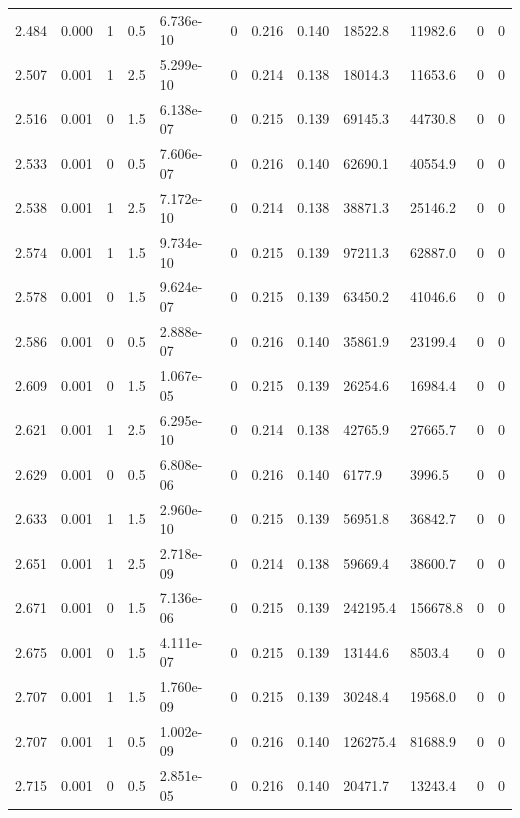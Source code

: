 \documentclass[preview]{standalone}
\begin{document}
{{{{\begin{tabular}{L{1.2cm}C{1.2cm} C{0.3cm}C{0.5cm} C{1.4cm}C{1.4cm} C{1.4cm}C{1.4cm} C{1.6cm}C{1.6cm} C{1.6cm}C{1.6cm}}
  2.484  &  0.000  & 1     & 0.5 &  6.736e-10  & 0  &  0.216&   0.140& 18522.8 & 11982.6   &  0 & 0  \\ 
  2.507  &  0.001  & 1     & 2.5 &  5.299e-10  & 0  &  0.214&   0.138& 18014.3 & 11653.6   &  0 & 0  \\ 
  2.516  &  0.001  & 0     & 1.5 &  6.138e-07  & 0  &  0.215&   0.139& 69145.3 & 44730.8   &  0 & 0  \\ 
  2.533  &  0.001  & 0     & 0.5 &  7.606e-07  & 0  &  0.216&   0.140& 62690.1 & 40554.9   &  0 & 0  \\ 
  2.538  &  0.001  & 1     & 2.5 &  7.172e-10  & 0  &  0.214&   0.138& 38871.3 & 25146.2   &  0 & 0  \\ 
  2.574  &  0.001  & 1     & 1.5 &  9.734e-10  & 0  &  0.215&   0.139& 97211.3 & 62887.0   &  0 & 0  \\ 
  2.578  &  0.001  & 0     & 1.5 &  9.624e-07  & 0  &  0.215&   0.139& 63450.2 & 41046.6   &  0 & 0  \\ 
  2.586  &  0.001  & 0     & 0.5 &  2.888e-07  & 0  &  0.216&   0.140& 35861.9 & 23199.4   &  0 & 0  \\ 
  2.609  &  0.001  & 0     & 1.5 &  1.067e-05  & 0  &  0.215&   0.139& 26254.6 & 16984.4   &  0 & 0  \\ 
  2.621  &  0.001  & 1     & 2.5 &  6.295e-10  & 0  &  0.214&   0.138& 42765.9 & 27665.7   &  0 & 0  \\ 
  2.629  &  0.001  & 0     & 0.5 &  6.808e-06  & 0  &  0.216&   0.140& 6177.9 & 3996.5   &  0 & 0  \\ 
  2.633  &  0.001  & 1     & 1.5 &  2.960e-10  & 0  &  0.215&   0.139& 56951.8 & 36842.7   &  0 & 0  \\ 
  2.651  &  0.001  & 1     & 2.5 &  2.718e-09  & 0  &  0.214&   0.138& 59669.4 & 38600.7   &  0 & 0  \\ 
  2.671  &  0.001  & 0     & 1.5 &  7.136e-06  & 0  &  0.215&   0.139& 242195.4 & 156678.8   &  0 & 0  \\ 
  2.675  &  0.001  & 0     & 1.5 &  4.111e-07  & 0  &  0.215&   0.139& 13144.6 & 8503.4   &  0 & 0  \\ 
  2.707  &  0.001  & 1     & 1.5 &  1.760e-09  & 0  &  0.215&   0.139& 30248.4 & 19568.0   &  0 & 0  \\ 
  2.707  &  0.001  & 1     & 0.5 &  1.002e-09  & 0  &  0.216&   0.140& 126275.4 & 81688.9   &  0 & 0  \\ 
  2.715  &  0.001  & 0     & 0.5 &  2.851e-05  & 0  &  0.216&   0.140& 20471.7 & 13243.4   &  0 & 0  \\ 

\end{tabular}}}}}
\end{document}
